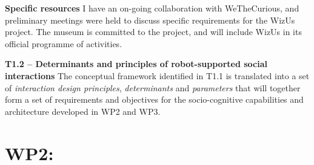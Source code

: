 \documentclass[11pt,a4paper]{report}
\newcommand{\project}{WizUs\xspace}
\begin{document}
\textbf{Specific resources} I have an on-going collaboration with WeTheCurious,
and preliminary meetings were held to discuss specific requirements for the
\project project. The museum is committed to the project, and will include
\project in its official programme of activities.

% 
% 
% 
% 
% 
% 
% 
% 
% 



\textbf{T1.2 -- Determinants and principles of robot-supported social
interactions} The conceptual framework identified in T1.1 is translated
into a set of \emph{interaction design principles}, \emph{determinants} and
\emph{parameters} that will together form a set of requirements and objectives
for the socio-cognitive capabilities and architecture developed in WP2 and WP3.

\section{WP2: \textbf{\wpTwo}}
\end{document}
